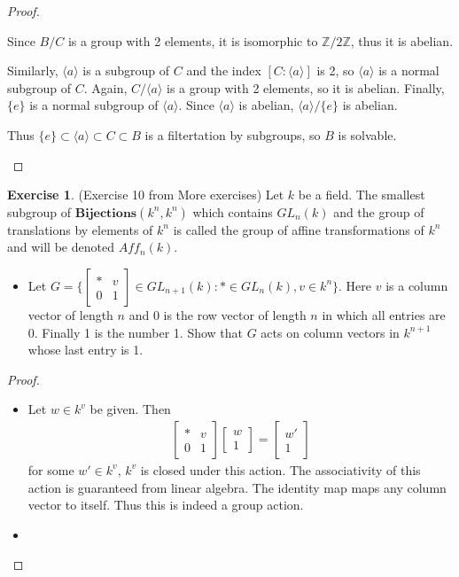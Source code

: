 \documentclass[12pt, psamsfonts]{amsart}
\theoremstyle{definition}
\newtheorem*{exer}{Exercise}
\theoremstyle{remark}
\numberwithin{equation}{section}
\begin{document}
\begin{proof}
\begin{itemize}
      Since $B / C$ is a group with 2 elements, it is isomorphic to $\mathbb{Z}/2\mathbb{Z}$, thus it is abelian.

      Similarly, $\langle a \rangle$ is a subgroup of $C$ and the index $[C:\langle a \rangle]$ is 2, so $\langle a \rangle$ is a normal subgroup of $C$.
      Again, $C / \langle a \rangle$ is a group with 2 elements, so it is abelian.
      Finally, $\{ e \}$ is a normal subgroup of $\langle a \rangle$.
      Since $\langle a \rangle$ is abelian, $\langle a \rangle / \{ e \}$ is abelian.

      Thus $\{ e \} \subset \langle a \rangle \subset C \subset B$ is a filtertation by subgroups, so $B$ is solvable.
  \end{itemize}
\end{proof}

\begin{exer}{(Exercise 10 from More exercises)}
  Let $k$ be a field.
  The smallest subgroup of $\textbf{Bijections}(k^n, k^n)$ which contains $GL_n(k)$ and the group of translations by elements of $k^n$ is called the group of affine transformations of $k^n$ and will be denoted $Aff_n(k)$.
  \begin{itemize}
    \item
      Let $G = \{ \begin{bmatrix} * & v \\ 0 & 1 \end{bmatrix} \in GL_{n + 1}(k): * \in GL_n(k), v \in k^n \}$.
      Here $v$ is a column vector of length $n$ and $0$ is the row vector of length $n$ in which all entries are 0.
      Finally 1 is the number 1.
      Show that $G$ acts on column vectors in $k^{n + 1}$ whose last entry is 1.
  \end{itemize}
\end{exer}

\begin{proof}
  $ $
  \begin{itemize}
    \item
      Let $w \in k^v$ be given.
      Then 
      \begin{align*}
        \begin{bmatrix} * & v \\ 0 & 1 \end{bmatrix}
          \begin{bmatrix} w \\ 1 \end{bmatrix}
            = \begin{bmatrix} w' \\ 1 \end{bmatrix}
      \end{align*}
      for some $w' \in k^v$, $k^v$ is closed under this action.
      The associativity of this action is guaranteed from linear algebra.
      The identity map maps any column vector to itself.
      Thus this is indeed a group action.
    \item
  \end{itemize}
\end{proof}
\end{document}

